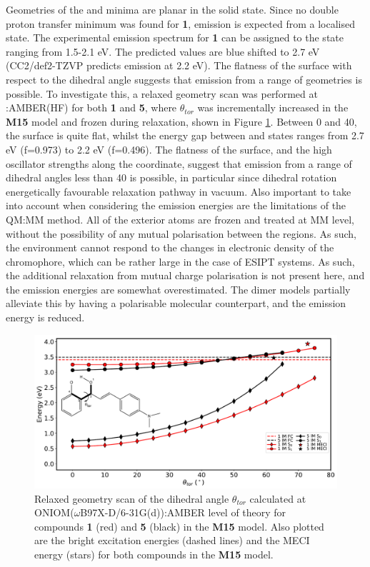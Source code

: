 Geometries of the \Estar{} and \Kstar{} minima are planar in the solid state. Since no double proton transfer \Kstar{} minimum was found for \textbf{1},  emission is expected from a localised \Kstar{} state. The experimental emission spectrum for \textbf{1} can be assigned to the \Kstar{} state ranging from 1.5-2.1 eV. The predicted values are blue shifted to 2.7 eV (CC2/def2-TZVP predicts emission at 2.2 eV). The flatness of the \sone{} surface with respect to the dihedral angle suggests that emission from a range of geometries is possible. To investigate this, a relaxed geometry scan was performed at \lowlevel:AMBER(HF) for both \textbf{1} and \textbf{5}, where $\theta_{tor}$ was incrementally increased in the \textbf{M15} model and frozen during relaxation, shown in Figure \ref{figure: HC_Oniom_Scan}. Between 0 and 40{\textdegree}, the \sone{} surface is quite flat, whilst the energy gap between \sone{} and \szero{} states ranges from 2.7 eV (f=0.973) to 2.2 eV (f=0.496). The flatness of the surface, and the high oscillator strengths along the coordinate, suggest that emission from a range of dihedral angles less than 40{\textdegree} is possible, in particular since dihedral rotation energetically favourable relaxation pathway in vacuum. Also important to take into account when considering the emission energies are the limitations of the QM:MM method. All of the exterior atoms are frozen and treated at MM level, without the possibility of any mutual polarisation between the regions. As such, the environment cannot respond to the changes in electronic density of the chromophore, which can be rather large in the case of ESIPT systems. As such, the additional relaxation from mutual charge polarisation is not present here, and the emission energies are somewhat overestimated. The dimer models partially alleviate this by having a polarisable molecular counterpart, and the emission energy is reduced. 

\begin{figure}[t]
\centering
  \includegraphics[width=0.8\linewidth]{4IntraInterInteractions/HC_Oniom_Scan.pdf}
  \caption[Relaxed geometry scan in the crystal]{Relaxed geometry scan of the dihedral angle $\theta_{tor}$ calculated at ONIOM($\omega$B97X-D/6-31G(d)):AMBER level of theory for compounds \textbf{1} (red) and \textbf{5} (black) in the \textbf{M15} model. Also plotted are the bright excitation energies (dashed lines) and the MECI energy (stars) for both compounds in the \textbf{M15} model.}
  \label{figure: HC_Oniom_Scan}
\end{figure}

